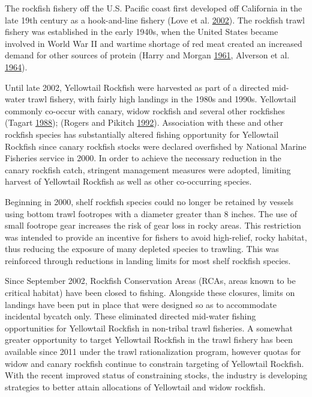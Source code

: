 \documentclass[12pt,]{article}
\begin{document}
The rockfish fishery off the U.S. Pacific coast first developed off
California in the late 19th century as a hook-and-line fishery (Love et
al. \protect\hyperlink{ref-Love2002}{2002}). The rockfish trawl fishery
was established in the early 1940s, when the United States became
involved in World War II and wartime shortage of red meat created an
increased demand for other sources of protein (Harry and Morgan
\protect\hyperlink{ref-Harry1961}{1961}, Alverson et al.
\protect\hyperlink{ref-Alverson1964}{1964}).

Until late 2002, Yellowtail Rockfish were harvested as part of a
directed mid-water trawl fishery, with fairly high landings in the 1980s
and 1990s. Yellowtail commonly co-occur with canary, widow rockfish and
several other rockfishes (Tagart
\protect\hyperlink{ref-Tagart1988}{1988}); (Rogers and Pikitch
\protect\hyperlink{ref-Rogers1992}{1992}). Association with these and
other rockfish species has substantially altered fishing opportunity for
Yellowtail Rockfish since canary rockfish stocks were declared
overfished by National Marine Fisheries service in 2000. In order to
achieve the necessary reduction in the canary rockfish catch, stringent
management measures were adopted, limiting harvest of Yellowtail
Rockfish as well as other co-occurring species.

Beginning in 2000, shelf rockfish species could no longer be retained by
vessels using bottom trawl footropes with a diameter greater than 8
inches. The use of small footrope gear increases the risk of gear loss
in rocky areas. This restriction was intended to provide an incentive
for fishers to avoid high-relief, rocky habitat, thus reducing the
exposure of many depleted species to trawling. This was reinforced
through reductions in landing limits for most shelf rockfish species.

Since September 2002, Rockfish Conservation Areas (RCAs, areas known to
be critical habitat) have been closed to fishing. Alongside these
closures, limits on landings have been put in place that were designed
so as to accommodate incidental bycatch only. These eliminated directed
mid-water fishing opportunities for Yellowtail Rockfish in non-tribal
trawl fisheries. A somewhat greater opportunity to target Yellowtail
Rockfish in the trawl fishery has been available since 2011 under the
trawl rationalization program, however quotas for widow and canary
rockfish continue to constrain targeting of Yellowtail Rockfish. With
the recent improved status of constraining stocks, the industry is
developing strategies to better attain allocations of Yellowtail and
widow rockfish.
\end{document}
